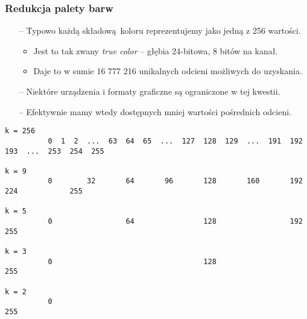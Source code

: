 \documentclass[usenames,dvipsnames,aspectratio=43,presentation]{beamer}
\begin{document}
    \begin{frame}[fragile]
        \frametitle{Redukcja palety barw}
        \footnotesize

        \begin{itemize}
            \setlength{\itemsep}{0.5em}
            \item[--] Typowo każdą składową koloru reprezentujemy jako jedną z 256 wartości.
                      \begin{itemize}
                          \setlength{\itemsep}{0.25em}
                          \scriptsize
                          \item Jest to tak zwany \textit{true color} – głębia 24-bitowa, 8 bitów na kanał.
                          \item Daje to w sumie 16 777 216 unikalnych odcieni możliwych do uzyskania.
                      \end{itemize}
            \item[--] Niektóre urządzenia i formaty graficzne są ograniczone w tej kwestii.
            \item[--] Efektywnie mamy wtedy dostępnych mniej wartości pośrednich odcieni.
        \end{itemize}

        \vfill

        \begin{minipage}{\textwidth}
            \label{fs-code}
            \begin{verbatim}
k = 256
          0  1  2  ...  63  64  65  ...  127  128  129  ...  191  192  193  ...  253  254  255

k = 9
          0        32       64       96       128       160       192       224            255

k = 5
          0                 64                128                 192                      255

k = 3
          0                                   128                                          255

k = 2
          0                                                                                255
            \end{verbatim}
        \end{minipage}
    \end{frame}
\end{document}

